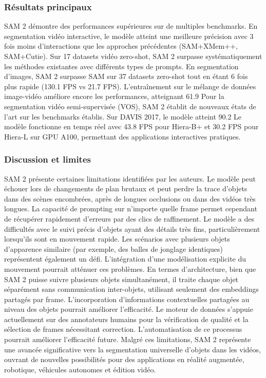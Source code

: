 \subsubsection{Résultats principaux}
SAM 2 démontre des performances supérieures sur de multiples benchmarks. En segmentation vidéo interactive, le modèle atteint une meilleure précision avec 3 fois moins d'interactions que les approches précédentes (SAM+XMem++, SAM+Cutie). Sur 17 datasets vidéo zero-shot, SAM 2 surpasse systématiquement les méthodes existantes avec différents types de prompts.
En segmentation d'images, SAM 2 surpasse SAM sur 37 datasets zero-shot tout en étant 6 fois plus rapide (130.1 FPS vs 21.7 FPS). L'entraînement sur le mélange de données image-vidéo améliore encore les performances, atteignant 61.9%
Pour la segmentation vidéo semi-supervisée (VOS), SAM 2 établit de nouveaux états de l'art sur les benchmarks établis. Sur DAVIS 2017, le modèle atteint 90.2%
Le modèle fonctionne en temps réel avec 43.8 FPS pour Hiera-B+ et 30.2 FPS pour Hiera-L sur GPU A100, permettant des applications interactives pratiques.
\subsubsection{Discussion et limites}
SAM 2 présente certaines limitations identifiées par les auteurs. Le modèle peut échouer lors de changements de plan brutaux et peut perdre la trace d'objets dans des scènes encombrées, après de longues occlusions ou dans des vidéos très longues. La capacité de prompting sur n'importe quelle frame permet cependant de récupérer rapidement d'erreurs par des clics de raffinement.
Le modèle a des difficultés avec le suivi précis d'objets ayant des détails très fins, particulièrement lorsqu'ils sont en mouvement rapide. Les scénarios avec plusieurs objets d'apparence similaire (par exemple, des balles de jonglage identiques) représentent également un défi. L'intégration d'une modélisation explicite du mouvement pourrait atténuer ces problèmes.
En termes d'architecture, bien que SAM 2 puisse suivre plusieurs objets simultanément, il traite chaque objet séparément sans communication inter-objets, utilisant seulement des embeddings partagés par frame. L'incorporation d'informations contextuelles partagées au niveau des objets pourrait améliorer l'efficacité.
Le moteur de données s'appuie actuellement sur des annotateurs humains pour la vérification de qualité et la sélection de frames nécessitant correction. L'automatisation de ce processus pourrait améliorer l'efficacité future. Malgré ces limitations, SAM 2 représente une avancée significative vers la segmentation universelle d'objets dans les vidéos, ouvrant de nouvelles possibilités pour des applications en réalité augmentée, robotique, véhicules autonomes et édition vidéo.

